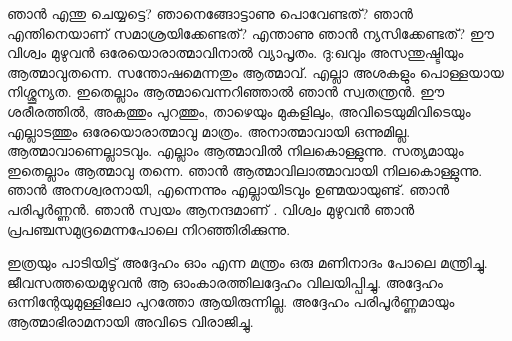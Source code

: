 

ഞാൻ എന്തു ചെയ്യട്ടെ? ഞാനെങ്ങോട്ടാണു പൊവേണ്ടത്? ഞാൻ എന്തിനെയാണ്‌ സമാശ്രയിക്കേണ്ടത്? എന്താണു ഞാൻ ന്യസിക്കേണ്ടത്? ഈ വിശ്വം മുഴുവൻ ഒരേയൊരാത്മാവിനാൽ വ്യാപൃതം. ദു:ഖവും അസന്തുഷ്ടിയും ആത്മാവുതന്നെ. സന്തോഷമെന്നതും ആത്മാവ്. എല്ലാ അശകളും പൊള്ളയായ നിശ്ശൂന്യത. ഇതെല്ലാം ആത്മാവെന്നറിഞ്ഞാൽ ഞാൻ സ്വതന്ത്രൻ. ഈ ശരീരത്തിൽ, അകത്തും പുറത്തും, താഴെയും മുകളിലും, അവിടെയുമിവിടെയും എല്ലാടത്തും ഒരേയൊരാത്മാവു മാത്രം. അനാത്മാവായി ഒന്നുമില്ല. ആത്മാവാണെല്ലാടവും. എല്ലാം ആത്മാവിൽ നിലകൊള്ളുന്നു. സത്യമായും ഇതെല്ലാം ആത്മാവു തന്നെ. ഞാൻ ആത്മാവിലാത്മാവായി നിലകൊള്ളുന്നു.
ഞാൻ അനശ്വരനായി, എന്നെന്നും എല്ലായിടവും ഉണ്മയായുണ്ട്. ഞാൻ പരിപൂർണ്ണൻ. ഞാൻ സ്വയം ആനന്ദമാണ് . വിശ്വം മുഴുവൻ ഞാൻ പ്രപഞ്ചസമുദ്രമെന്നപോലെ നിറഞ്ഞിരിക്കുന്നു.

ഇത്രയും പാടിയിട്ട് അദ്ദേഹം ഓം എന്ന മന്ത്രം ഒരു മണിനാദം പോലെ മന്ത്രിച്ചു. ജീവസത്തയെമുഴുവൻ ആ ഓംകാരത്തിലദ്ദേഹം വിലയിപ്പിച്ചു. അദ്ദേഹം ഒന്നിന്റേയുമുള്ളിലോ പുറത്തോ ആയിരുന്നില്ല. അദ്ദേഹം പരിപൂർണ്ണമായും ആത്മാഭിരാമനായി അവിടെ വിരാജിച്ചു. 
